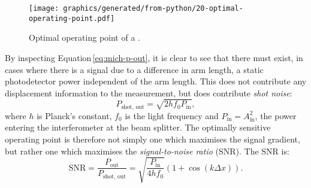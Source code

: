 \begin{figure}
  \centering
  \texttt{[image: graphics/generated/from-python/20-optimal-operating-point.pdf]}
  \caption[Optimal operating point of a \MI{}]{\label{fig:optimal-operating-point}Optimal operating point of a \MI{}.}
\end{figure}

By inspecting Equation\,\ref{eq:mich-p-out}, it is clear to see that there must exist, in cases where there is a signal due to a difference in arm length, a static photodetector power independent of the arm length. This does not contribute any displacement information to the measurement, but does contribute \emph{shot noise}:
\begin{equation}
  P_{\text{shot, out}} = \sqrt{2 h f_0 P_{\text{in}}},
\end{equation}
where $h$ is Planck's constant, $f_0$ is the light frequency and $P_{\text{in}} = A_{\text{in}}^2$, the power entering the interferometer at the beam splitter. The optimally sensitive operating point is therefore not simply one which maximises the signal gradient, but rather one which maximises the \emph{signal-to-noise ratio} (\gls{SNR}). The \gls{SNR} is:
\begin{equation}
  \text{SNR} = \frac{P_{\text{out}}}{P_{\text{shot, out}}} = \sqrt{\frac{P_{\text{in}}}{4 h f_0}} \left( 1 + \cos \left(k \Delta x \right) \right).
\end{equation}

